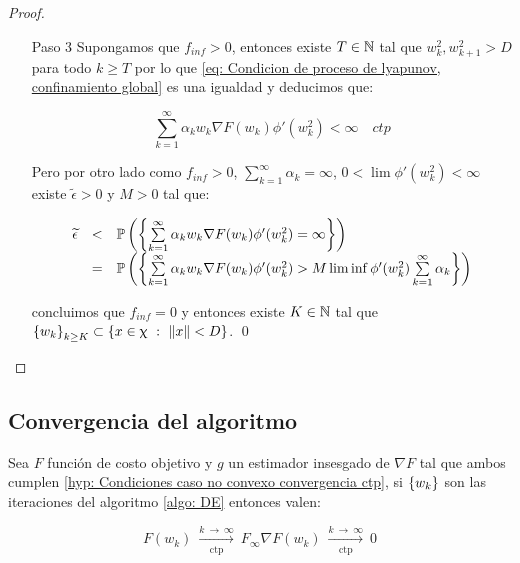 \begin{proof}
\begin{enumerate}
		\item[Paso 3] Supongamos que $f_{inf} >0$, entonces existe $T \in {\mathbb{N}}$  tal que $w_k^2, w_{k+1}^2 > D$ para todo $k \geq T$ por lo que \ref{eq: Condicion de proceso de lyapunov, confinamiento global} es una igualdad y deducimos que:
		
		\begin{equation}
			\sum\limits_{k=1}^{\infty} {\alpha_k w_k \nabla F(w_k) \phi'(w_k^2)} < \infty \quad ctp
		\end{equation}
		
		Pero por otro lado como $f_{inf} >0$, $\sum\limits_{k=1}^{\infty} {\alpha_k} = \infty$, $0 < \lim \phi'(w_k^2) < \infty$ existe $\widetilde{\epsilon} > 0$ y $M > 0$ tal que:
		
		\begin{equation*}
			\begin{array}{rcl}
			\widetilde{\epsilon} & < & \mathbb{P} \left(\left\lbrace\sum\limits_{k=1}^{\infty} {\alpha_k w_k \nabla F(w_k) \phi'(w_k^2)} = \infty \right\rbrace\right) \\
			& = & \mathbb{P} \left(\left\lbrace\sum\limits_{k=1}^{\infty} {\alpha_k w_k \nabla F(w_k) \phi'(w_k^2)} > M \liminf \phi'(w_k^2)\sum\limits_{k=1}^{\infty} {\alpha_k}\right\rbrace\right) 
			\end{array}
		\end{equation*}
		
		concluimos que $f_{inf} = 0$ y entonces existe $K \in {\mathbb{N}}$ tal que $\left\lbrace w_k\right\rbrace_{k \geq K} \subset \left\lbrace x \in \upchi ~:~ \left\lVert x\right\rVert < D \right\rbrace$. \qed
		
	\end{enumerate}
	
\end{proof}

\subsection{Convergencia del algoritmo}

\begin{theorem}
	Sea $F$ funci\'on de costo objetivo y $g$ un estimador insesgado de $\nabla F$ tal que ambos cumplen \ref{hyp: Condiciones caso no convexo convergencia ctp}, si $\left\lbrace w_k\right\rbrace$ son las iteraciones del algoritmo \ref{algo: DE} entonces valen:
	
		\begin{subequations}
		\begin{equation}
		F(w_k) \ \xrightarrow[\text{ctp}]{k \ \rightarrow \ \infty } \ F_{\infty}
		\end{equation}
		\begin{equation}
		\nabla F(w_k) \ \xrightarrow[\text{ctp}]{k \ \rightarrow \ \infty } \ 0
		\end{equation}
	\end{subequations}
	
\end{theorem}


